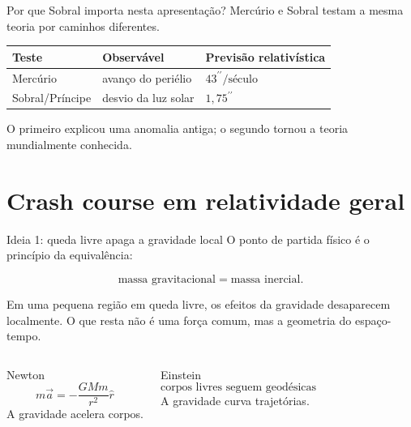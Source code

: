 \documentclass[aspectratio=169,10pt]{beamer}
\newcommand{\arcsec}{^{\prime\prime}}
\begin{document}
\begin{frame}{Por que Sobral importa nesta apresentação?}
  Mercúrio e Sobral testam a mesma teoria por caminhos diferentes.

  \vspace{0.3cm}
  \begin{table}
    \centering
    \begin{tabular}{lll}
      \toprule
      Teste & Observável & Previsão relativística \\
      \midrule
      Mercúrio & avanço do periélio & $43\arcsec/\text{século}$ \\
      Sobral/Príncipe & desvio da luz solar & $1{,}75\arcsec$ \\
      \bottomrule
    \end{tabular}
  \end{table}

  \vspace{0.35cm}
  O primeiro explicou uma anomalia antiga; o segundo tornou a teoria mundialmente conhecida.
\end{frame}

\section{Crash course em relatividade geral}

\begin{frame}{Ideia 1: queda livre apaga a gravidade local}
  O ponto de partida físico é o princípio da equivalência:

  \vspace{0.25cm}
  \[
    \text{massa gravitacional} = \text{massa inercial}.
  \]

  \vspace{0.25cm}
  Em uma pequena região em queda livre, os efeitos da gravidade desaparecem localmente. O que resta não é uma força comum, mas a geometria do espaço-tempo.

  \vspace{0.35cm}
  \begin{columns}[T,onlytextwidth]
    \centering
    {\color{MercuryMuted}Newton}
    \[
      m\vec a = -\frac{GMm}{r^2}\hat r
    \]
    A gravidade acelera corpos.

    \centering
    {\color{MercuryMuted}Einstein}
    \[
      \text{corpos livres seguem geodésicas}
    \]
    A gravidade curva trajetórias.
  \end{columns}
\end{frame}
\end{document}
